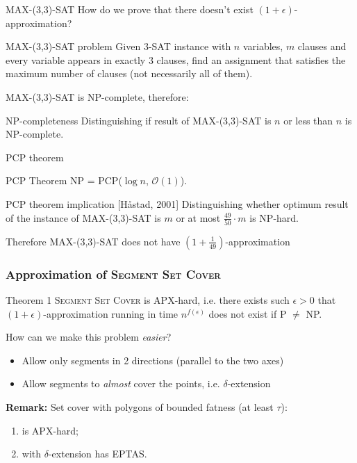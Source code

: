 \documentclass{beamer}
\begin{document}
\begin{frame}{\textsc{MAX-(3,3)-SAT}}
How do we prove that there doesn't exist $(1+\epsilon)$-approximation?


\begin{block}{\textsc{MAX-(3,3)-SAT} problem}
Given 3-SAT instance with $n$ variables, $m$ clauses
and every variable appears in exactly 3 clauses,
find an assignment
that satisfies the maximum number of clauses
(not necessarily all of them).
\end{block}

MAX-(3,3)-SAT is NP-complete, therefore:

\begin{block}{NP-completeness}
Distinguishing if result of MAX-(3,3)-SAT is
$n$ or less than $n$ is NP-complete.
\end{block}
\end{frame}

\begin{frame}{PCP theorem}
\begin{block}{PCP Theorem}
NP = PCP($\log n$, $\mathcal{O}(1)$).
\end{block}

\begin{block}{PCP theorem implication [Håstad, 2001]}
Distinguishing whether optimum result of
the instance of MAX-(3,3)-SAT is $m$
or at most $\frac{49}{50} \cdot m$ is NP-hard.
\end{block}

Therefore MAX-(3,3)-SAT does not have
$(1+\frac{1}{49})$-approximation
\end{frame}


\begin{frame}
\frametitle{Approximation of \textsc{Segment Set Cover}}
\begin{block}{Theorem 1}
	\textsc{Segment Set Cover} is APX-hard, i.e.
	there exists such $\epsilon>0$
	that $(1+\epsilon)$-approximation 
	running in time $n^{f(\epsilon)}$ does not exist if P $\neq$ NP.
\end{block}

How can we make this problem \textit{easier}?
\begin{itemize}
\item Allow only segments in 2 directions (parallel to the two axes)
\item Allow segments to \textit{almost} cover the points, i.e. $\delta$-extension
\end{itemize}

\pause

\bigskip

\textbf{Remark:}
	Set cover with polygons of bounded fatness (at least $\tau$):
	\begin{enumerate}
	\item is APX-hard;
	\item with $\delta$-extension has EPTAS.
	\end{enumerate}

\end{frame}
\end{document}
